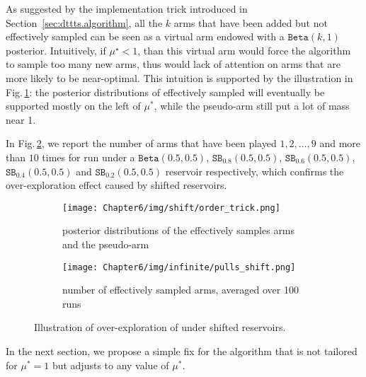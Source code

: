 As suggested by the implementation trick introduced in Section~\ref{sec:dttts.algorithm}, all the $k$ arms that have been added but not effectively sampled can be seen as a virtual arm endowed with a $\texttt{Beta}(k,1)$ posterior. Intuitively, if $\mu^\star < 1$, than this virtual arm would force the algorithm to sample too many new arms, thus would lack of attention on arms that are more likely to be near-optimal. This intuition is supported by the illustration in Fig.\,\ref{fig:shifted_reservoir}: the posterior distributions of effectively sampled will eventually be supported mostly on the left of $\mu^*$, while the pseudo-arm still put a lot of mass near 1. 

In Fig.\,\ref{fig:arms_shift}, we report the number of arms that have been played $1,2,\dots,9$ and more than $10$ times for \DTTTS run under a $\texttt{Beta}(0.5,0.5)$, $\texttt{SB}_{0.8}(0.5,0.5)$, $\texttt{SB}_{0.6}(0.5,0.5)$, $\texttt{SB}_{0.4}(0.5,0.5)$ and $\texttt{SB}_{0.2}(0.5,0.5)$ reservoir respectively, which confirms the over-exploration effect caused by shifted reservoirs.

\begin{figure}[ht]
  \centering
  \begin{subfigure}[t]{0.45\textwidth}
    \centering\texttt{[image: Chapter6/img/shift/order\_trick.png]}
    \caption{posterior distributions of the effectively samples arms and the pseudo-arm}
    \label{fig:shifted_reservoir}
  \end{subfigure}%
  \hspace{0.5cm}
  \begin{subfigure}[t]{0.45\textwidth}
    \centering\texttt{[image: Chapter6/img/infinite/pulls\_shift.png]}
    \caption{number of effectively sampled arms, averaged over 100 runs}
    \label{fig:arms_shift}
  \end{subfigure}%
  \caption{Illustration of over-exploration of \DTTTS under shifted reservoirs.}
  \label{fig:arms}
\end{figure}

In the next section, we propose a simple fix for the algorithm that is not tailored for $\mu^*=1$ but adjusts to any value of $\mu^*$.
